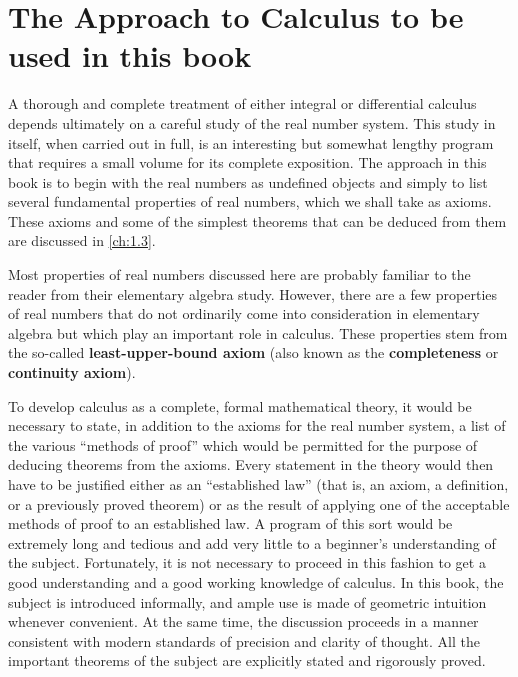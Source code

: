 \section{The Approach to Calculus to be used in this book}\label{sec:1.1.6}

\begin{note}
  A thorough and complete treatment of either integral or differential calculus depends ultimately on a careful study of the real number system.
  This study in itself, when carried out in full, is an interesting but somewhat lengthy program that requires a small volume for its complete exposition.
  The approach in this book is to begin with the real numbers as undefined objects and simply to list several fundamental properties of real numbers, which we shall take as axioms.
  These axioms and some of the simplest theorems that can be deduced from them are discussed in \cref{ch:1.3}.

  Most properties of real numbers discussed here are probably familiar to the reader from their elementary algebra study.
  However, there are a few properties of real numbers that do not ordinarily come into consideration in elementary algebra but which play an important role in calculus.
  These properties stem from the so-called \textbf{least-upper-bound axiom} (also known as the \textbf{completeness} or \textbf{continuity axiom}).

  To develop calculus as a complete, formal mathematical theory, it would be necessary to state, in addition to the axioms for the real number system, a list of the various ``methods of proof'' which would be permitted for the purpose of deducing theorems from the axioms.
  Every statement in the theory would then have to be justified either as an ``established law''
  (that is, an axiom, a definition, or a previously proved theorem) or as the result of applying one of the acceptable methods of proof to an established law.
  A program of this sort would be extremely long and tedious and add very little to a beginner's understanding of the subject.
  Fortunately, it is not necessary to proceed in this fashion to get a good understanding and a good working knowledge of calculus.
  In this book, the subject is introduced informally, and ample use is made of geometric intuition whenever convenient.
  At the same time, the discussion proceeds in a manner consistent with modern standards of precision and clarity of thought.
  All the important theorems of the subject are explicitly stated and rigorously proved.
\end{note}
